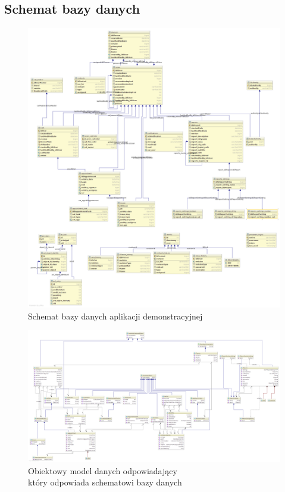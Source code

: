\subsection{Schemat bazy danych}
\begin{figure}[H]
	\centering
	\includegraphics[width=1.1\textwidth]{images/db_UML}
	\caption[Schemat bazy danych aplikacji demonstracyjnej]{
		Schemat bazy danych aplikacji demonstracyjnej
	}
	\label{app:schema_db}
\end{figure}
\begin{figure}[H]
	\centering
	\includegraphics[angle=90,height=\textheight]{images/springatom_model_uml}
	\caption[Obiektowy model danych]{
		Obiektowy model danych odpowiadający\\który odpowiada schematowi bazy danych
	}
	\label{app:schema_org_agatom_springatom_model}
\end{figure}
